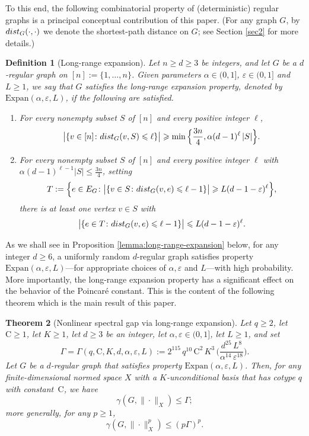 \documentclass[11pt,leqno]{amsart}
\newtheorem{theorem}{Theorem}[section]
\newtheorem{definition}[theorem]{Definition}
\theoremstyle{remark}
\theoremstyle{plain}
\def\dist{{\rm dist}}
\def\dist{{\rm dist}}
\begin{document}
To this end, the following combinatorial property of (deterministic) regular graphs is a principal conceptual
contribution of this paper. (For any graph $G$, by $\dist_G(\cdot,\cdot)$ we denote the
shortest-path distance on $G$; see Section \ref{sec2} for more details.)
\begin{definition}[Long-range expansion] \label{def-lre}
Let $n\geqslant d\geqslant 3$ be integers, and let $G$ be a $d$-regular graph on $[n]:=\{1,\dots,n\}$.
Given parameters $\alpha\in(0,1]$, $\varepsilon\in(0,1]$ and $L\geqslant 1$, we say that $G$
satisfies the \emph{long-range expansion property}, denoted by $\mathrm{Expan}(\alpha,\varepsilon,L)$,
if the following are satisfied.
\begin{enumerate}
\item[$(A)$] \label{Part-A} For every nonempty subset $S$ of $[n]$ and every positive integer $\ell$,
\[ \big|\{v\in [n]\colon \dist_G(v,S)\leqslant \ell\}\big|
\geqslant \min\Big\{\frac{3n}{4},\alpha (d-1)^\ell\,|S|\Big\}. \]
\item[$(B)$] \label{Part-B} For every nonempty subset $S$ of $[n]$ and every positive integer $\ell$ with
$\alpha (d-1)^{\ell-1}|S|\leqslant \frac{3n}{4}$, setting
\[ T:=\Big\{e\in E_G\colon \big|\{v\in S \colon \dist_G(v,e)\leqslant \ell-1\}\big|\geqslant L(d-1-\varepsilon)^\ell\Big\}, \]
there is at least one vertex $v\in S$ with
\[ \big|\{e\in T\colon \dist_G(v,e)\leqslant \ell-1\}\big|\leqslant L(d-1-\varepsilon)^\ell. \]
\end{enumerate}
\end{definition}
As we shall see in Proposition \ref{lemma:long-range-expansion} below,
for any integer $d\geqslant 6$, a uniformly random $d$-regular graph satisfies property
$\mathrm{Expan}(\alpha,\varepsilon,L)$---for appropriate choices
of $\alpha,\varepsilon$ and $L$---with high probability. More importantly, the long-range expansion
property has a significant effect on the behavior of the Poincar\'{e} constant. This is the content of the
following theorem which is the main result of this paper.
\begin{theorem}[Nonlinear spectral gap via long-range expansion] \label{aekjfnakfn}
Let $q\geqslant 2$, let $\mathrm{C}\geqslant 1$, let $K\geqslant 1$, let $d\geqslant 3$ be an integer, let $\alpha,\varepsilon\in (0,1]$, let $L\geqslant 1$, and set
\begin{equation} \label{eq-Gamma}
\Gamma=\Gamma(q,\mathrm{C},K,d,\alpha,\varepsilon,L):= 2^{115}\, q^{10}\, \mathrm{C}^2\, K^3\,
\Big( \frac{d^{25}\, L^8}{\alpha^{14}\, \varepsilon^{18}}\Big). %
\end{equation}
Let $G$ be a $d$-regular graph that satisfies property $\mathrm{Expan}(\alpha,\varepsilon,L)$.
Then, for any finite-dimensional normed space $X$ with a $K$-unconditional basis that has cotype $q$
with constant\, $\mathrm{C}$, we have
\begin{equation} \label{eq-new1}
\gamma(G,\|\cdot\|_X) \leqslant \Gamma;
\end{equation}
more generally, for any $p\geqslant 1$,
\begin{equation} \label{eq-newnew1}
\gamma(G,\|\cdot\|^p_X) \leqslant (p\Gamma)^p.
\end{equation}
\end{theorem}
\end{document}

